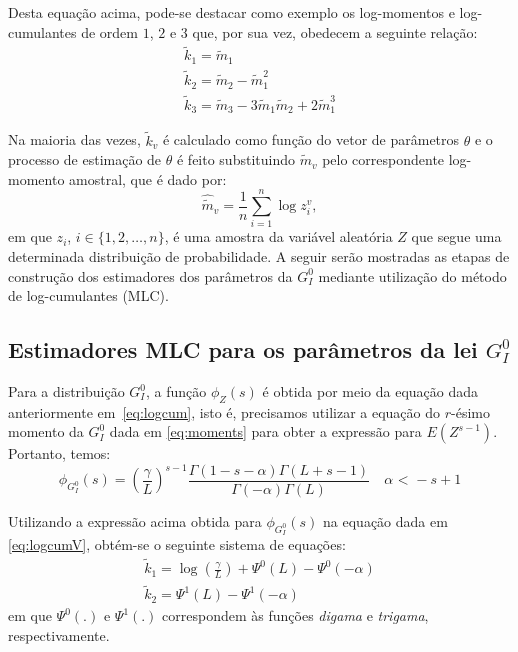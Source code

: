 Desta equação acima, pode-se destacar como exemplo os log-momentos e log-cumulantes de ordem $1$, $2$ e $3$ que, por sua vez, obedecem a seguinte relação:
\begin{equation}
    \begin{matrix}
        \widetilde{k}_{1} = \widetilde{m}_{1} \\ 
        \widetilde{k}_{2} = \widetilde{m}_{2} - \widetilde{m}_{1}^{2} \\
        \widetilde{k}_{3} = \widetilde{m}_{3} - 3\widetilde{m}_{1}\widetilde{m}_{2} + 2\widetilde{m}_{1}^{3} 
    \end{matrix}
    \label{eq:logcum123}
\end{equation}

Na maioria das vezes, $\widetilde{k}_{v}$ é calculado como função do vetor de parâmetros $\theta$ e o processo de estimação de $\theta$ é feito substituindo $\widetilde{m}_{v}$ pelo correspondente log-momento amostral, que é dado por:
\begin{equation}
    \widehat{\widetilde{m}}_{v} = \frac{1}{n}\sum_{i=1}^{n}\log z_{i}^{v},
    \label{eq:log_momAmostrais}
\end{equation}
em que $z_i$, $i \in \{1, 2, \dots, n\}$, é uma amostra da variável aleatória $Z$ que segue uma determinada distribuição de probabilidade. A seguir serão mostradas as etapas de construção dos estimadores dos parâmetros da $G_I^0$ mediante utilização do método de log-cumulantes (MLC). 

\subsection{Estimadores MLC para os parâmetros da lei $G_I^0$}

Para a distribuição $G_I^0$, a função $\phi_{Z}(s)$ é obtida por meio da equação dada anteriormente em~\eqref{eq:logcum}, isto é, precisamos utilizar a equação do $r$-ésimo momento da $G_I^0$ dada em \eqref{eq:moments} para obter a expressão para $E(Z^{s-1})$. Portanto, temos:
\begin{equation}
    \phi_{G_I^0}(s) = \left ( \frac{\gamma}{L} \right )^{s-1}\frac{\Gamma(1-s-\alpha)\Gamma(L+s-1)}{\Gamma(-\alpha)\Gamma(L)}  \quad \alpha \text{ < } -s+1
\end{equation}

Utilizando a expressão acima obtida para $\phi_{G_I^0}(s)$ na equação dada em \eqref{eq:logcumV}, obtém-se o seguinte sistema de equações:
\begin{equation}
    \begin{matrix}
        \widetilde{k}_{1} = \log \left ( \frac{\gamma}{L} \right ) + \Psi^{0}(L) - \Psi^{0}(-\alpha)  \\ 
        \widetilde{k}_{2} = \Psi^{1}(L) - \Psi^{1}(-\alpha)
    \end{matrix}
\end{equation}
em que $\Psi^{0}(.)$ e $\Psi^{1}(.)$ correspondem às funções \textit{digama} e \textit{trigama}, respectivamente.

